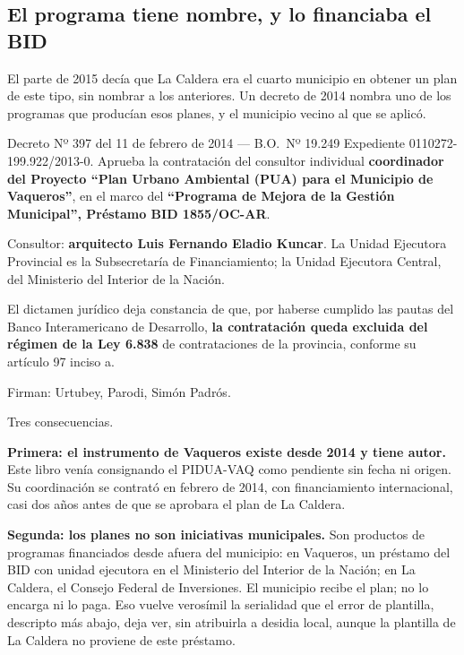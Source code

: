 \subsection*{El programa tiene nombre, y lo financiaba el BID}

El parte de 2015 decía que La Caldera era el cuarto municipio en obtener un plan de este tipo, sin nombrar a los anteriores. Un decreto de 2014 nombra uno de los programas que producían esos planes, y el municipio vecino al que se aplicó.

\begin{ficha}{Decreto Nº 397 del 11 de febrero de 2014 --- B.O.\ Nº 19.249}
Expediente 0110272-199.922/2013-0. Aprueba la contratación del consultor individual \textbf{coordinador del Proyecto ``Plan Urbano Ambiental (PUA) para el Municipio de Vaqueros''}, en el marco del \textbf{``Programa de Mejora de la Gestión Municipal'', Préstamo BID 1855/OC-AR}.

Consultor: \textbf{arquitecto Luis Fernando Eladio Kuncar}. La Unidad Ejecutora Provincial es la Subsecretaría de Financiamiento; la Unidad Ejecutora Central, del Ministerio del Interior de la Nación.

El dictamen jurídico deja constancia de que, por haberse cumplido las pautas del Banco Interamericano de Desarrollo, \textbf{la contratación queda excluida del régimen de la Ley 6.838} de contrataciones de la provincia, conforme su artículo 97 inciso a.

Firman: Urtubey, Parodi, Simón Padrós.
\end{ficha}

Tres consecuencias.

\textbf{Primera: el instrumento de Vaqueros existe desde 2014 y tiene autor.} Este libro venía consignando el PIDUA-VAQ como pendiente sin fecha ni origen. Su coordinación se contrató en febrero de 2014, con financiamiento internacional, casi dos años antes de que se aprobara el plan de La Caldera.

\textbf{Segunda: los planes no son iniciativas municipales.} Son productos de programas financiados desde afuera del municipio: en Vaqueros, un préstamo del BID con unidad ejecutora en el Ministerio del Interior de la Nación; en La Caldera, el Consejo Federal de Inversiones. El municipio recibe el plan; no lo encarga ni lo paga. Eso vuelve verosímil la serialidad que el error de plantilla, descripto más abajo, deja ver, sin atribuirla a desidia local, aunque la plantilla de La Caldera no proviene de este préstamo.

